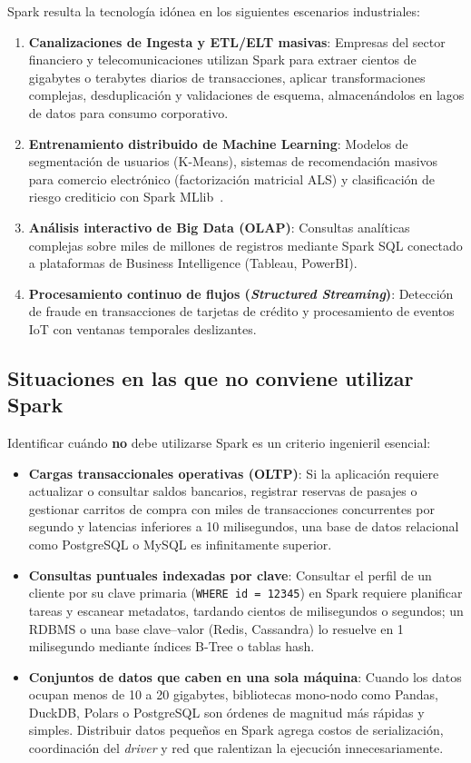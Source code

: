 \documentclass[conference,a4paper]{IEEEtran}
\begin{document}
Spark resulta la tecnología idónea en los siguientes escenarios industriales:
\begin{enumerate}
\item \textbf{Canalizaciones de Ingesta y ETL/ELT masivas}: Empresas del sector financiero y telecomunicaciones utilizan Spark para extraer cientos de gigabytes o terabytes diarios de transacciones, aplicar transformaciones complejas, desduplicación y validaciones de esquema, almacenándolos en lagos de datos para consumo corporativo.
\item \textbf{Entrenamiento distribuido de Machine Learning}: Modelos de segmentación de usuarios (K-Means), sistemas de recomendación masivos para comercio electrónico (factorización matricial ALS) y clasificación de riesgo crediticio con Spark MLlib~\cite{meng2016mllib}.
\item \textbf{Análisis interactivo de Big Data (OLAP)}: Consultas analíticas complejas sobre miles de millones de registros mediante Spark SQL conectado a plataformas de Business Intelligence (Tableau, PowerBI).
\item \textbf{Procesamiento continuo de flujos (\textit{Structured Streaming})}: Detección de fraude en transacciones de tarjetas de crédito y procesamiento de eventos IoT con ventanas temporales deslizantes.
\end{enumerate}

\subsection{Situaciones en las que no conviene utilizar Spark}

Identificar cuándo \textbf{no} debe utilizarse Spark es un criterio ingenieril esencial:
\begin{itemize}
\item \textbf{Cargas transaccionales operativas (OLTP)}: Si la aplicación requiere actualizar o consultar saldos bancarios, registrar reservas de pasajes o gestionar carritos de compra con miles de transacciones concurrentes por segundo y latencias inferiores a 10 milisegundos, una base de datos relacional como PostgreSQL o MySQL es infinitamente superior.
\item \textbf{Consultas puntuales indexadas por clave}: Consultar el perfil de un cliente por su clave primaria (\texttt{WHERE id = 12345}) en Spark requiere planificar tareas y escanear metadatos, tardando cientos de milisegundos o segundos; un RDBMS o una base clave--valor (Redis, Cassandra) lo resuelve en 1 milisegundo mediante índices B-Tree o tablas hash.
\item \textbf{Conjuntos de datos que caben en una sola máquina}: Cuando los datos ocupan menos de 10 a 20 gigabytes, bibliotecas mono-nodo como Pandas, DuckDB, Polars o PostgreSQL son órdenes de magnitud más rápidas y simples. Distribuir datos pequeños en Spark agrega costos de serialización, coordinación del \textit{driver} y red que ralentizan la ejecución innecesariamente.
\end{itemize}
\end{document}
